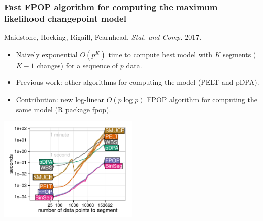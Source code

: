 \documentclass{beamer}
\newcommand{\algo}[1]{\textcolor{#1}{#1}}
\begin{document}
\begin{frame}
  \frametitle{Fast FPOP algorithm for computing the maximum likelihood
    changepoint model}

  Maidstone, Hocking, Rigaill, Fearnhead, {\it Stat. and
    Comp.} 2017.

  \begin{itemize}
  \item Naively exponential $O(p^K)$ time to compute best model with
    $K$ segments ($K-1$ changes) for a sequence of $p$ data.
  \item Previous work: other algorithms for computing the model
    (\algo{PELT} and \algo{pDPA}).
  \item Contribution: new log-linear $O(p\log p)$ \algo{FPOP}
    algorithm for computing the same model (R package fpop).
  \end{itemize}
  \begin{center}
    \includegraphics[width=0.5\textwidth]{figure-systemtime-arrays-bins}
  \end{center}
\end{frame}
\end{document}
